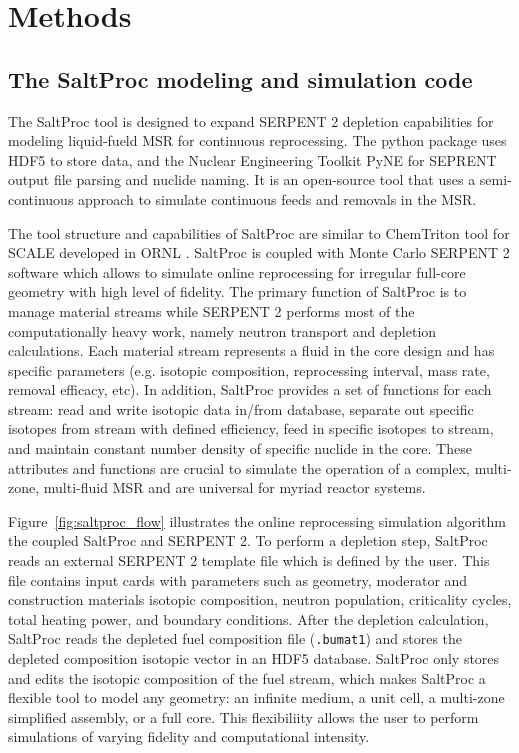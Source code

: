 
\section{Methods}


\subsection{The SaltProc modeling and simulation code}

The SaltProc tool is designed to expand SERPENT 2 depletion capabilities for modeling liquid-fueld \gls{MSR} for continuous reprocessing.
The python package uses HDF5 \cite{the_hdf_group_hierarchial_1997} to store data, and the Nuclear Engineering Toolkit PyNE \cite{scopatz_pyne:_2012}
for SEPRENT output file parsing and nuclide naming. It is an open-source tool that uses a semi-continuous approach to 
simulate continuous feeds and removals in the \gls{MSR}.

The tool structure and capabilities of SaltProc are similar to ChemTriton tool for SCALE developed in \gls{ORNL} \cite{powers_new_2013}.
SaltProc is coupled with Monte Carlo SERPENT 2 software which allows to simulate online reprocessing for irregular full-core geometry with high level of fidelity.  The primary function of SaltProc is to manage material streams while SERPENT 2 performs most of the computationally heavy work, namely neutron transport and depletion calculations. Each material stream represents a fluid in the core design and has specific parameters (e.g. isotopic composition, reprocessing interval, mass rate, removal efficacy, etc). In addition, SaltProc provides a set of functions for each stream: read and write isotopic data in/from database, separate out specific isotopes from stream with defined efficiency, feed in specific isotopes to stream, and maintain constant number density of specific nuclide in the core. These attributes and functions are crucial to simulate the operation of a complex, multi-zone, multi-fluid \gls{MSR} and are universal for myriad reactor systems.

Figure~\ref{fig:saltproc_flow} illustrates the  online reprocessing simulation algorithm the coupled SaltProc and SERPENT 2. To perform a depletion step,
SaltProc reads an external SERPENT 2 template file which is defined by the user. This file contains input cards with parameters such as geometry,
moderator and construction materials isotopic composition, neutron population, criticality cycles, total heating power, and boundary conditions.
After the depletion calculation, SaltProc reads the depleted fuel composition file (\texttt{.bumat1}) and stores the depleted
composition isotopic vector in an HDF5 database. SaltProc only stores and edits the isotopic composition of the fuel stream,
which makes SaltProc a flexible tool to model any geometry: an infinite medium, a unit cell, a multi-zone simplified assembly, or a full core.
This flexibiliity allows the user to perform simulations of varying fidelity and computational intensity.


